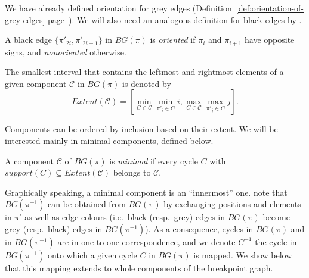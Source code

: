 \documentclass[review]{elsarticle}
\newcommand{\ie}{i.e.\ }
\newcommand{\resp}{resp.\ }
\begin{document}
We have already defined orientation for grey edges (Definition~\ref{def:orientation-of-grey-edges} page~\pageref{def:orientation-of-grey-edges}). We will also need an analogous definition for black edges by \citet{tannier-subquadratic}.

\begin{definition}\label{def:orientation-of-black-edges}
\cite{tannier-subquadratic} A black edge $\{\pi'_{2i}, \pi'_{2i+1}\}$ in $BG(\pi)$ is \emph{oriented} if $\pi_i$ and $\pi_{i+1}$ have opposite signs, and \emph{nonoriented} otherwise.
\end{definition}

\begin{definition}\cite{hannenhalli-transforming}
The smallest interval that contains the leftmost and rightmost elements of a given component $\mathscr C$ in $BG(\pi)$ is denoted by
$$Extent(\mathscr C)=\left[\min_{C\in\mathscr C}\min_{\pi'_i\in C}i,\max_{C\in\mathscr C}\max_{\pi'_j\in C}j \right].$$
\end{definition}

Components can be ordered by inclusion based on their extent. We will be interested mainly in minimal components, defined below.

\begin{definition}\cite{hannenhalli-transforming}\label{def:minimal-component}
 A component $\mathscr C$ of $BG(\pi)$ is \emph{minimal} if every cycle $C$ with $support(C)\subseteq Extent(\mathscr C)$ belongs to $\mathscr C$.
\end{definition}

Graphically speaking, a minimal component is an ``innermost'' one. \citet{tannier-subquadratic} note that $BG(\pi^{-1})$ can be obtained from $BG(\pi)$ by exchanging positions and elements in $\pi'$ as well as edge colours (\ie black (\resp grey) edges in $BG(\pi)$ become grey (\resp black) edges in $BG(\pi^{-1})$). As a consequence, cycles in $BG(\pi)$ and in $BG(\pi^{-1})$ are in one-to-one correspondence, and we denote $C^{-1}$ the cycle in $BG(\pi^{-1})$ onto which a given cycle $C$ in $BG(\pi)$ is mapped. We show below that this mapping extends to whole components of the breakpoint graph.
\end{document}
